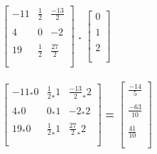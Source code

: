 \documentclass{article}
\begin{document}
\begin{hbox}{

$\left[
\begin{array} {rrr}
-11 & \frac{1}{2} & \frac{-13}{2}\\\\
4 & 0 & -2\\\\
19 & \frac{1}{2} & \frac{27}{2}\\\\
\end{array}
\right]
$
\textbf{.}
$\left[
\begin{array} {c}
0\\\\
1\\\\
2\\\\
\end{array}
\right]
$
\\\rightarrow\\
$\left[
\begin{array} {rrr}
-11_*0 & \frac{1}{2}_*1 & \frac{-13}{2}_*2\\\\
4_*0 & 0_*1 & -2_*2\\\\
19_*0 & \frac{1}{2}_*1 & \frac{27}{2}_*2\\\\
\end{array}
\right]
$
\textbf{=}
$\left[
\begin{array} {c}
\frac{-14}{5}\\\\
\frac{-63}{10}\\\\
\frac{41}{10}\\\\
\end{array}
\right]
$}
\end{hbox}
\newpage
\end{document}
